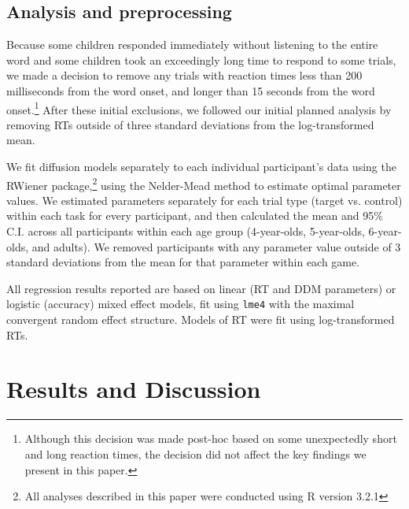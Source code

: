\documentclass[man, noapacite]{apa2}
\begin{document}
\subsection{Analysis and preprocessing}

Because some children responded immediately without listening to the entire word and some children took an exceedingly long time to respond to some trials, we made a decision to remove any trials with reaction times less than 200 milliseconds from the word onset, and longer than 15 seconds from the word onset.\footnote{Although this decision was made post-hoc based on some unexpectedly short and long reaction times, the decision did not affect the key findings we present in this paper.} After these initial exclusions, we followed our initial planned analysis by removing RTs outside of three standard deviations from the log-transformed mean.

We fit diffusion models separately to each individual participant's data using the RWiener package,\footnote{All analyses described in this paper were conducted using R version 3.2.1} using the Nelder-Mead method to estimate optimal parameter values. We estimated parameters separately for each trial type (target vs. control) within each task for every participant, and then calculated the mean and 95\% C.I. across all participants within each age group (4-year-olds, 5-year-olds, 6-year-olds, and adults). We removed participants with any parameter value outside of 3 standard deviations from the mean for that parameter within each game.  

All regression results reported are based on linear (RT and DDM parameters) or logistic (accuracy) mixed effect models, fit using \texttt{lme4} with the maximal convergent random effect structure. Models of RT were fit using log-transformed RTs.


\section{Results and Discussion}
\end{document}
